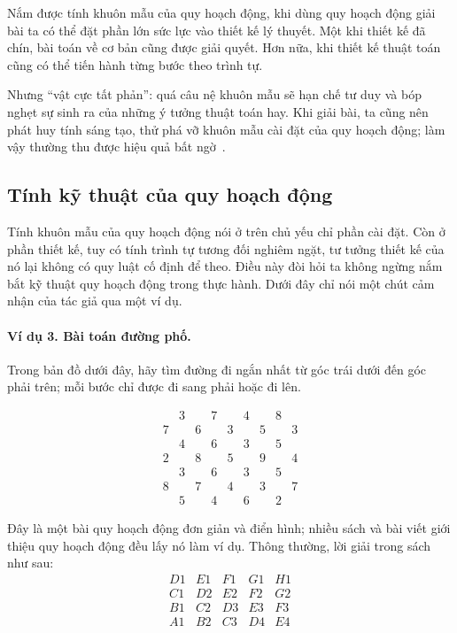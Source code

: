 \documentclass[11pt]{article}
\begin{document}
Nắm được tính khuôn mẫu của quy hoạch động, khi dùng quy hoạch động giải bài
ta có thể đặt phần lớn sức lực vào thiết kế lý thuyết. Một khi thiết kế đã
chín, bài toán về cơ bản cũng được giải quyết. Hơn nữa, khi thiết kế thuật
toán cũng có thể tiến hành từng bước theo trình tự.

Nhưng ``vật cực tất phản'': quá câu nệ khuôn mẫu sẽ hạn chế tư duy và bóp
nghẹt sự sinh ra của những ý tưởng thuật toán hay. Khi giải bài, ta cũng nên
phát huy tính sáng tạo, thử phá vỡ khuôn mẫu cài đặt của quy hoạch động; làm
vậy thường thu được hiệu quả bất ngờ~\cite{runway-report}.

\subsection{Tính kỹ thuật của quy hoạch động}

Tính khuôn mẫu của quy hoạch động nói ở trên chủ yếu chỉ phần cài đặt. Còn ở
phần thiết kế, tuy có tính trình tự tương đối nghiêm ngặt, tư tưởng thiết kế
của nó lại không có quy luật cố định để theo. Điều này đòi hỏi ta không
ngừng nắm bắt kỹ thuật quy hoạch động trong thực hành. Dưới đây chỉ nói một
chút cảm nhận của tác giả qua một ví dụ.

\paragraph{Ví dụ 3. Bài toán đường phố.}
Trong bản đồ dưới đây, hãy tìm đường đi ngắn nhất từ góc trái dưới đến góc
phải trên; mỗi bước chỉ được đi sang phải hoặc đi lên.

\[
\begin{array}{ccccccccc}
  &3& &7& &4& &8&\\
7&&6&&3&&5&&3\\
  &4& &6& &3& &5&\\
2&&8&&5&&9&&4\\
  &3& &6& &3& &5&\\
8&&7&&4&&3&&7\\
  &5& &4& &6& &2&
\end{array}
\]

Đây là một bài quy hoạch động đơn giản và điển hình; nhiều sách và bài viết
giới thiệu quy hoạch động đều lấy nó làm ví dụ. Thông thường, lời giải trong
sách như sau:
\[
\begin{array}{ccccc}
D1&E1&F1&G1&H1\\
C1&D2&E2&F2&G2\\
B1&C2&D3&E3&F3\\
A1&B2&C3&D4&E4
\end{array}
\]
\end{document}
